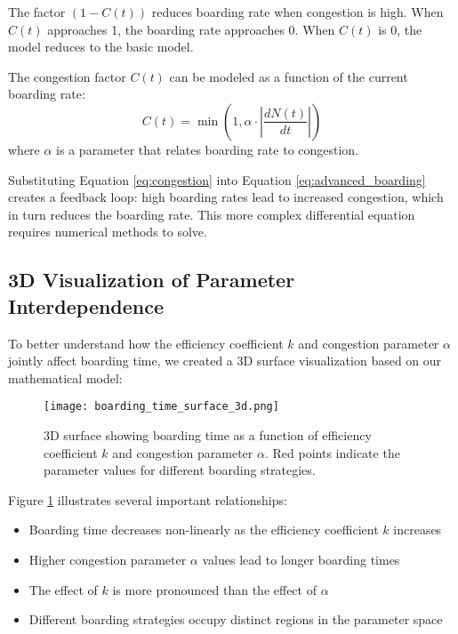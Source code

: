 \documentclass[12pt,a4paper]{article}
\begin{document}
The factor $(1 - C(t))$ reduces boarding rate when congestion is high. When $C(t)$ approaches 1, the boarding rate approaches 0. When $C(t)$ is 0, the model reduces to the basic model.

The congestion factor $C(t)$ can be modeled as a function of the current boarding rate:
\begin{equation}
C(t) = \min\left(1, \alpha \cdot \left| \frac{dN(t)}{dt} \right| \right)
\label{eq:congestion}
\end{equation}
where $\alpha$ is a parameter that relates boarding rate to congestion.

Substituting Equation \ref{eq:congestion} into Equation \ref{eq:advanced_boarding} creates a feedback loop: high boarding rates lead to increased congestion, which in turn reduces the boarding rate. This more complex differential equation requires numerical methods to solve.

\subsection{3D Visualization of Parameter Interdependence}

To better understand how the efficiency coefficient $k$ and congestion parameter $\alpha$ jointly affect boarding time, we created a 3D surface visualization based on our mathematical model:

\begin{figure}[H]
\centering
\texttt{[image: boarding\_time\_surface\_3d.png]}
\caption{3D surface showing boarding time as a function of efficiency coefficient $k$ and congestion parameter $\alpha$. Red points indicate the parameter values for different boarding strategies.}
\label{fig:boarding_surface}
\end{figure}

Figure \ref{fig:boarding_surface} illustrates several important relationships:

\begin{itemize}
    \item Boarding time decreases non-linearly as the efficiency coefficient $k$ increases
    \item Higher congestion parameter $\alpha$ values lead to longer boarding times
    \item The effect of $k$ is more pronounced than the effect of $\alpha$
    \item Different boarding strategies occupy distinct regions in the parameter space
\end{itemize}
\end{document}
